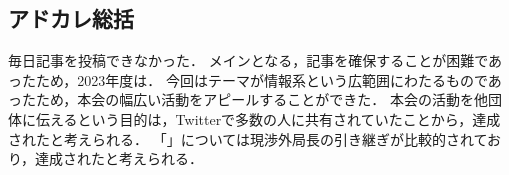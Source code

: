 \subsection*{アドカレ総括}


毎日記事を投稿できなかった．
メインとなる\firstGrade{}，記事を確保することが困難であったため，2023年度は．
今回はテーマが情報系という広範囲にわたるものであったため，本会の幅広い活動をアピールすることができた．
本会の活動を他団体に伝えるという目的は，Twitterで多数の人に共有されていたことから，達成されたと考えられる．
「」については現渉外局長の引き継ぎが比較的されており，達成されたと考えられる．

